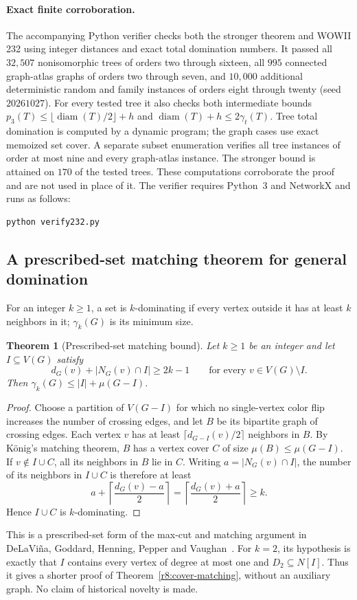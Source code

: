 \documentclass[11pt,a4paper]{article}
\newtheorem{theorem}{Theorem}[section]
\theoremstyle{remark}
\begin{document}
\paragraph{Exact finite corroboration.}
The accompanying Python verifier checks both the stronger theorem and
WOWII 232 using integer distances and exact total domination numbers.
It passed all $32{,}507$ nonisomorphic trees of orders two through sixteen,
all $995$ connected graph-atlas graphs of orders two through seven,
and $10{,}000$ additional deterministic random and family instances of
orders eight through twenty (seed $20261027$). For every tested tree it
also checks both intermediate bounds
$p_3(T)\le\lfloor\operatorname{diam}(T)/2\rfloor+h$ and
$\operatorname{diam}(T)+h\le2\gamma_t(T)$.
Tree total domination is computed by a dynamic program; the graph cases
use exact memoized set cover. A separate subset enumeration verifies
all tree instances of order at most nine and every graph-atlas instance.
The stronger bound is attained on $170$ of the tested trees.
These computations corroborate the proof and are not used in place of it.
The verifier requires Python~3 and NetworkX and runs as follows:
\begin{verbatim}
python verify232.py
\end{verbatim}

\subsection{A prescribed-set matching theorem for general domination}
For an integer $k\ge1$, a set is $k$-dominating if every vertex outside
it has at least $k$ neighbors in it; $\gamma_k(G)$ is its minimum size.
\begin{theorem}[Prescribed-set matching bound]
\label{r9:prescribed-cut}
Let $k\ge1$ be an integer and let $I\subseteq V(G)$ satisfy
\[
 d_G(v)+|N_G(v)\cap I|\ge 2k-1
 \qquad\text{for every }v\in V(G)\setminus I.
\]
Then $\gamma_k(G)\le |I|+\mu(G-I)$.
\end{theorem}
\begin{proof}
Choose a partition of $V(G-I)$ for which no single-vertex color flip
increases the number of crossing edges,
and let $B$ be its bipartite graph of crossing edges. Each vertex $v$ has
at least $\lceil d_{G-I}(v)/2\rceil$ neighbors in $B$.
By K\"onig's matching theorem, $B$ has a vertex cover $C$ of size
$\mu(B)\le\mu(G-I)$. If $v\notin I\cup C$, all its neighbors in $B$ lie
in $C$. Writing $a=|N_G(v)\cap I|$, the number of its neighbors in
$I\cup C$ is therefore at least
\[
 a+\left\lceil\frac{d_G(v)-a}{2}\right\rceil
 =\left\lceil\frac{d_G(v)+a}{2}\right\rceil\ge k.
\]
Hence $I\cup C$ is $k$-dominating.
\end{proof}
This is a prescribed-set form of the max-cut and matching argument in
DeLaVi\~na, Goddard, Henning, Pepper and Vaughan~\cite{DGHPV11}.
For $k=2$, its hypothesis is exactly that $I$ contains every vertex of
degree at most one and $D_2\subseteq N[I]$. Thus it gives a shorter proof
of Theorem~\ref{r8:cover-matching}, without an auxiliary graph.
No claim of historical novelty is made.
\end{document}
